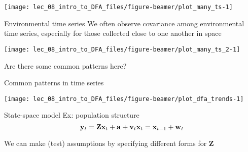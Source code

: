 \documentclass[
  ignorenonframetext,
]{beamer}
\begin{document}
\begin{frame}{}
\protect\hypertarget{section-2}{}
\begin{center}\texttt{[image: lec\_08\_intro\_to\_DFA\_files/figure-beamer/plot\_many\_ts-1]} \end{center}
\end{frame}

\begin{frame}{Environmental time series}
\protect\hypertarget{environmental-time-series}{}
We often observe covariance among environmental time series, especially
for those collected close to one another in space
\end{frame}

\begin{frame}{}
\protect\hypertarget{section-3}{}
\begin{center}\texttt{[image: lec\_08\_intro\_to\_DFA\_files/figure-beamer/plot\_many\_ts\_2-1]} \end{center}

Are there some common patterns here?
\end{frame}

\begin{frame}{Common patterns in time series}
\protect\hypertarget{common-patterns-in-time-series}{}
\begin{center}\texttt{[image: lec\_08\_intro\_to\_DFA\_files/figure-beamer/plot\_dfa\_trends-1]} \end{center}
\end{frame}

\begin{frame}{State-space model \textbar{} Ex: population structure}
\protect\hypertarget{state-space-model-ex-population-structure}{}
\[
\mathbf{y}_t = \mathbf{Z} \mathbf{x}_t + \mathbf{a} + \mathbf{v}_t \\
\mathbf{x}_t = \mathbf{x}_{t-1} + \mathbf{w}_t
\]

We can make (test) assumptions by specifying different forms for
\(\mathbf{Z}\)
\end{frame}
\end{document}
